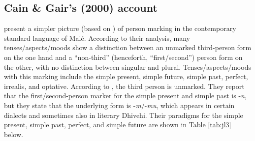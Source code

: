 \documentclass[output=paper]{langsci/langscibook}
\begin{document}
\begin{table}
\caption{Person suffixes according to \cite{Fritz2002}}
\label{tab:jl2}	
\end{table}


\subsection{Cain \& Gair’s (2000) account}\label{s:jl2-2}

\cite[23--27]{CainGair2000} present a simpler picture (based on \citealt[54--63]{Cain2000}) of person marking in the contemporary standard language of Malé. According to their analysis, many tenses/aspects/moods show a distinction between an unmarked third-person form on the one hand and a “non-third” (henceforth, “first/second”) person form on the other, with no distinction between singular and plural. Tenses/aspects/moods with this marking include the simple present, simple future, simple past, perfect, irrealis, and optative. According to \citeauthor{CainGair2000}, the third person is unmarked. They report that the first/second-person marker for the simple present and simple past is -\textit{n}, but they state that the underlying form is -\textit{m}/-\textit{mu}, which appears in certain dialects and sometimes also in literary Dhivehi. Their paradigms for the simple present, simple past, perfect, and simple future are shown in Table \ref{tab:jl3} below.
\end{document}
